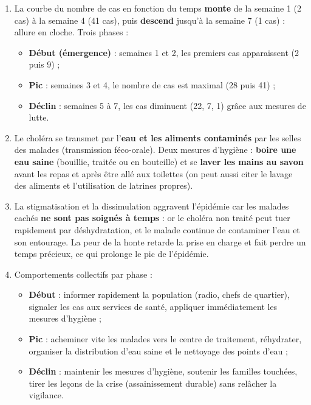 \documentclass[11pt]{article}
\begin{document}
\begin{corrige}
\begin{enumerate}
\item La courbe du nombre de cas en fonction du temps \textbf{monte} de la semaine 1 (2 cas) à la semaine 4 (41 cas), puis \textbf{descend} jusqu'à la semaine 7 (1 cas) : allure en cloche. Trois phases :
\begin{itemize}
\item \textbf{Début (émergence)} : semaines 1 et 2, les premiers cas apparaissent (2 puis 9) ;
\item \textbf{Pic} : semaines 3 et 4, le nombre de cas est maximal (28 puis 41) ;
\item \textbf{Déclin} : semaines 5 à 7, les cas diminuent (22, 7, 1) grâce aux mesures de lutte.
\end{itemize}
\item Le choléra se transmet par l'\textbf{eau et les aliments contaminés} par les selles des malades (transmission féco-orale). Deux mesures d'hygiène : \textbf{boire une eau saine} (bouillie, traitée ou en bouteille) et se \textbf{laver les mains au savon} avant les repas et après être allé aux toilettes (on peut aussi citer le lavage des aliments et l'utilisation de latrines propres).
\item La stigmatisation et la dissimulation aggravent l'épidémie car les malades cachés \textbf{ne sont pas soignés à temps} : or le choléra non traité peut tuer rapidement par déshydratation, et le malade continue de contaminer l'eau et son entourage. La peur de la honte retarde la prise en charge et fait perdre un temps précieux, ce qui prolonge le pic de l'épidémie.
\item Comportements collectifs par phase :
\begin{itemize}
\item \textbf{Début} : informer rapidement la population (radio, chefs de quartier), signaler les cas aux services de santé, appliquer immédiatement les mesures d'hygiène ;
\item \textbf{Pic} : acheminer vite les malades vers le centre de traitement, réhydrater, organiser la distribution d'eau saine et le nettoyage des points d'eau ;
\item \textbf{Déclin} : maintenir les mesures d'hygiène, soutenir les familles touchées, tirer les leçons de la crise (assainissement durable) sans relâcher la vigilance.
\end{itemize}

\end{enumerate}
\end{corrige}
\end{document}
